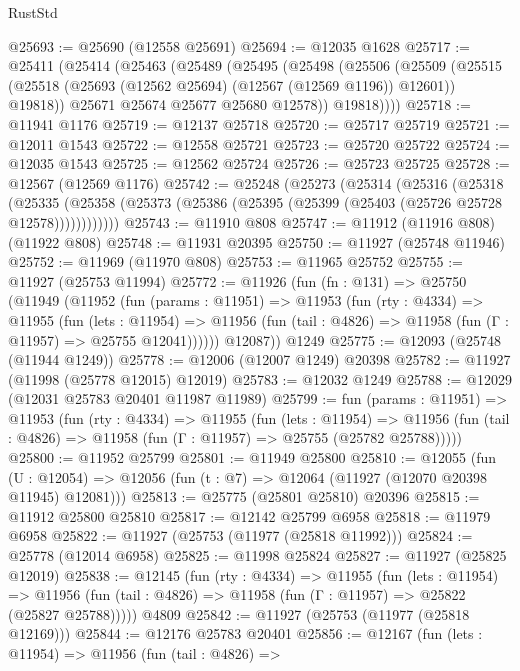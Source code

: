 \begin{lexlean}{RustStd}
\begin{coremodule}
@25693 := @25690 (@12558 @25691)
@25694 := @12035 @1628
@25717 := @25411
    (@25414
      (@25463
        (@25489
          (@25495
            (@25498
              (@25506
                (@25509
                  (@25515 (@25518 (@25693 (@12562 @25694) (@12567 (@12569 @1196)) @12601)) @19818))
                @25671
                @25674
                @25677
                @25680
                @12578))
            @19818))))
@25718 := @11941 @1176
@25719 := @12137 @25718
@25720 := @25717 @25719
@25721 := @12011 @1543
@25722 := @12558 @25721
@25723 := @25720 @25722
@25724 := @12035 @1543
@25725 := @12562 @25724
@25726 := @25723 @25725
@25728 := @12567 (@12569 @1176)
@25742 := @25248
    (@25273
      (@25314
        (@25316
          (@25318
            (@25335
              (@25358 (@25373 (@25386 (@25395 (@25399 (@25403 (@25726 @25728 @12578))))))))))))
@25743 := @11910 @808
@25747 := @11912 (@11916 @808) (@11922 @808)
@25748 := @11931 @20395
@25750 := @11927 (@25748 @11946)
@25752 := @11969 (@11970 @808)
@25753 := @11965 @25752
@25755 := @11927 (@25753 @11994)
@25772 := @11926
    (fun (fn : @131) =>
    @25750
      (@11949
        (@11952
          (fun (params : @11951) =>
          @11953
            (fun (rty : @4334) =>
            @11955
              (fun (lets : @11954) =>
              @11956 (fun (tail : @4826) => @11958 (fun (Γ : @11957) => @25755 @12041))))))
        @12087))
    @1249
@25775 := @12093 (@25748 (@11944 @1249))
@25778 := @12006 (@12007 @1249) @20398
@25782 := @11927 (@11998 (@25778 @12015) @12019)
@25783 := @12032 @1249
@25788 := @12029 (@12031 @25783 @20401 @11987 @11989)
@25799 := fun (params : @11951) =>
  @11953
    (fun (rty : @4334) =>
    @11955
      (fun (lets : @11954) =>
      @11956 (fun (tail : @4826) => @11958 (fun (Γ : @11957) => @25755 (@25782 @25788)))))
@25800 := @11952 @25799
@25801 := @11949 @25800
@25810 := @12055
    (fun (U : @12054) => @12056 (fun (t : @7) => @12064 (@11927 (@12070 @20398 @11945) @12081)))
@25813 := @25775 (@25801 @25810) @20396
@25815 := @11912 @25800 @25810
@25817 := @12142 @25799 @6958
@25818 := @11979 @6958
@25822 := @11927 (@25753 (@11977 (@25818 @11992)))
@25824 := @25778 (@12014 @6958)
@25825 := @11998 @25824
@25827 := @11927 (@25825 @12019)
@25838 := @12145
    (fun (rty : @4334) =>
    @11955
      (fun (lets : @11954) =>
      @11956 (fun (tail : @4826) => @11958 (fun (Γ : @11957) => @25822 (@25827 @25788)))))
    @4809
@25842 := @11927 (@25753 (@11977 (@25818 @12169)))
@25844 := @12176 @25783 @20401
@25856 := @12167
    (fun (lets : @11954) =>
    @11956
      (fun (tail : @4826) =>

\end{coremodule}
\end{lexlean}
